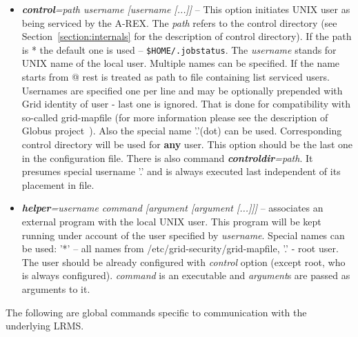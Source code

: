 \documentclass{article}                            %
\begin{document}
\begin{itemize}
\item \textbf{\textit{control}}\textit{=path username {[}username
    {[}...]]} -- This option initiates UNIX user as being serviced by
  the A-REX. The \textit{path} refers to the control directory (see
  Section~\ref{section:internals} for the description of control
  directory). If the path is {*} the default one is used --
  \texttt{\$HOME/.jobstatus}. The \textit{username} stands for UNIX name of
  the local user. Multiple names can be specified. If the name starts from
  {@} rest is treated as path to file containing list serviced users.
  Usernames are specified one per line and may be optionally prepended
  with Grid identity of user - last one is ignored. That is done for
  compatibility with so-called grid-mapfile (for more information 
  please see the description of Globus project~\cite{globus}). Also the
  special name '.'(dot) can be used. Corresponding control directory
  will be used for \textbf{any} user. This option should be the last
  one in the configuration file. There is also command
  \textbf{\textit{controldir}}\textit{=path}.  It presumes special
  username '.' and is always executed last independent of its
  placement in file.
\item \textbf{\textit{helper}}\textit{=username command {[}argument
    {[}argument {[}...]]]} -- associates an external program with the
  local UNIX user.  This program will be kept running under account of
  the user specified by \textit{username}. Special names can be used:
  '{*}' -- all names from /etc/grid-security/grid-mapfile, '.'  - root
  user. The user should be already configured with \textit{control}
  option (except root, who is always configured). \textit{command} is
  an executable and \textit{argument}s are passed as arguments to it.
\end{itemize}


The following are global commands specific to communication with the underlying
LRMS.

\end{document}

